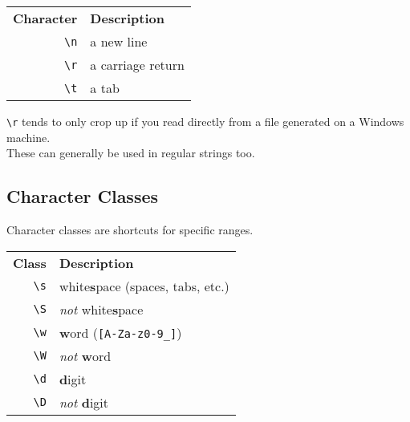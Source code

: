 \begin{center}
    \begin{small}
        \begin{tabularx}{\textwidth}{r l}
            \textbf{Character}          & \textbf{Description} \\
            \texttt{\textbackslash n}          & a new line \\
            \texttt{\textbackslash r}          & a carriage return \\
            \texttt{\textbackslash t}          & a tab \\
        \end{tabularx}
    \end{small}
\end{center}

\texttt{\textbackslash r} tends to only crop up if you read directly from a file generated on a Windows machine.
\\

These can generally be used in regular strings too.

\pagebreak

\subsection{Character Classes}

Character classes are shortcuts for specific ranges.

\begin{center}
    \begin{small}
        \begin{tabularx}{\textwidth}{r l}
            \textbf{Class}                    & \textbf{Description} \\
            \texttt{\textbackslash s}         & white\textbf{s}pace (spaces, tabs, etc.) \\
            \texttt{\textbackslash S}         & \textit{not} white\textbf{s}pace \\
            \texttt{\textbackslash w}         & \textbf{w}ord (\texttt{[A-Za-z0-9\_]}) \\
            \texttt{\textbackslash W}         & \textit{not} \textbf{w}ord \\
            \texttt{\textbackslash d}         & \textbf{d}igit \\
            \texttt{\textbackslash D}         & \textit{not} \textbf{d}igit
        \end{tabularx}
    \end{small}
\end{center}

